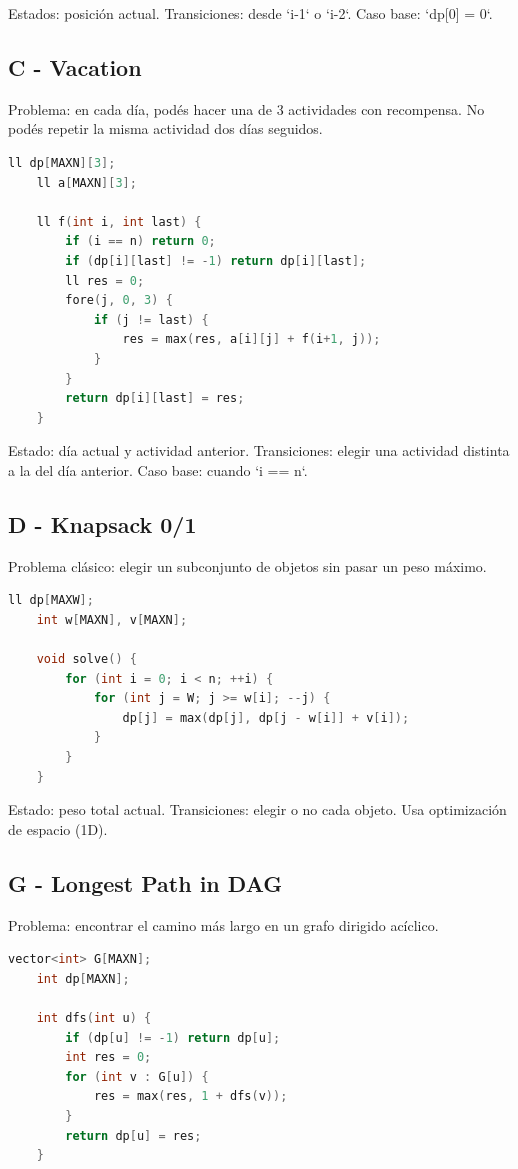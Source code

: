 Estados: posición actual.  
Transiciones: desde `i-1` o `i-2`.  
Caso base: `dp[0] = 0`.

\subsection{C - Vacation}

Problema: en cada día, podés hacer una de 3 actividades con recompensa. No podés repetir la misma actividad dos días seguidos.

\begin{lstlisting}[language=C++, caption=Vacation: DP sobre días y última actividad]
	ll dp[MAXN][3];
	ll a[MAXN][3];
	
	ll f(int i, int last) {
		if (i == n) return 0;
		if (dp[i][last] != -1) return dp[i][last];
		ll res = 0;
		fore(j, 0, 3) {
			if (j != last) {
				res = max(res, a[i][j] + f(i+1, j));
			}
		}
		return dp[i][last] = res;
	}
\end{lstlisting}

Estado: día actual y actividad anterior.  
Transiciones: elegir una actividad distinta a la del día anterior.  
Caso base: cuando `i == n`.

\subsection{D - Knapsack 0/1}

Problema clásico: elegir un subconjunto de objetos sin pasar un peso máximo.

\begin{lstlisting}[language=C++, caption=Mochila 0/1: DP por peso]
	ll dp[MAXW];
	int w[MAXN], v[MAXN];
	
	void solve() {
		for (int i = 0; i < n; ++i) {
			for (int j = W; j >= w[i]; --j) {
				dp[j] = max(dp[j], dp[j - w[i]] + v[i]);
			}
		}
	}
\end{lstlisting}

Estado: peso total actual.  
Transiciones: elegir o no cada objeto.  
Usa optimización de espacio (1D).

\subsection{G - Longest Path in DAG}

Problema: encontrar el camino más largo en un grafo dirigido acíclico.

\begin{lstlisting}[language=C++, caption=Camino más largo en DAG con DP + DFS]
	vector<int> G[MAXN];
	int dp[MAXN];
	
	int dfs(int u) {
		if (dp[u] != -1) return dp[u];
		int res = 0;
		for (int v : G[u]) {
			res = max(res, 1 + dfs(v));
		}
		return dp[u] = res;
	}
\end{lstlisting}

